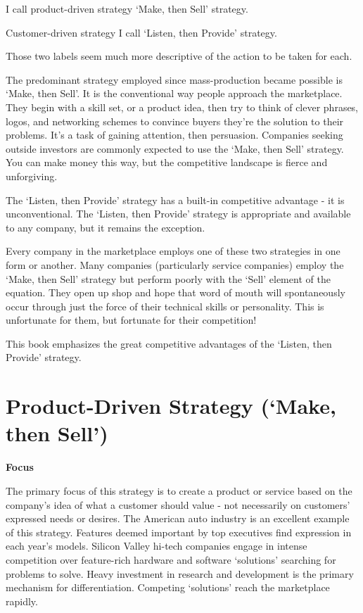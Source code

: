 \documentclass[
]{book}
\begin{document}
I call product-driven strategy { `Make, then Sell'} strategy.

Customer-driven strategy I call {`Listen, then Provide'} strategy.

Those two labels seem much more descriptive of the action to be taken for each.

The predominant strategy employed since mass-production became possible is { `Make, then Sell'}. It is the conventional way people approach the marketplace. They begin with a skill set, or a product idea, then try to think of clever phrases, logos, and networking schemes to convince buyers they're the solution to their problems. It's a task of gaining attention, then persuasion. Companies seeking outside investors are commonly expected to use the { `Make, then Sell'} strategy. You can make money this way, but the competitive landscape is fierce and unforgiving.

The {`Listen, then Provide'} strategy has a built-in competitive advantage - it is unconventional. The {`Listen, then Provide'} strategy is appropriate and available to any company, but it remains the exception.

Every company in the marketplace employs one of these two strategies in one form or another. Many companies (particularly service companies) employ the { `Make, then Sell'} strategy but perform poorly with the `Sell' element of the equation. They open up shop and hope that word of mouth will spontaneously occur through just the force of their technical skills or personality. This is unfortunate for them, but fortunate for their competition!

This book emphasizes the great competitive advantages of the {`Listen, then Provide'} strategy.

\hypertarget{product-driven-strategy-make-then-sell}{%
\section{\texorpdfstring{\textbf{Product-Driven Strategy ({`Make, then Sell'})}}{Product-Driven Strategy (`Make, then Sell')}}\label{product-driven-strategy-make-then-sell}}

\textbf{Focus}

The primary focus of this strategy is to create a product or service based on the company's idea of what a customer should value - not necessarily on customers' expressed needs or desires. The American auto industry is an excellent example of this strategy. Features deemed important by top executives find expression in each year's models. Silicon Valley hi-tech companies engage in intense competition over feature-rich hardware and software `solutions' searching for problems to solve. Heavy investment in research and development is the primary mechanism for differentiation. Competing `solutions' reach the marketplace rapidly.
\end{document}
